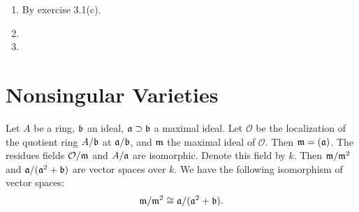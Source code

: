 \documentclass{note}
\begin{document}

\setcounter{exercise}{3}
\Ex
\begin{enumerate}
  \item By exercise 3.1(c).
  \item
  \item
\end{enumerate}

\section{Nonsingular Varieties}
\begin{proposition*}
  Let $A$ be a ring, $\mathfrak{b}$ an ideal, $\mathfrak{a} \supset \mathfrak{b}$ a
  maximal ideal. Let $\mathcal{O}$ be the localization of the quotient ring
  $A/\mathfrak{b}$ at $\mathfrak{a}/\mathfrak{b}$, and $\mathfrak{m}$ the maximal ideal of
  $\mathcal{O}$. Then $\mathfrak{m} = (\mathfrak{a})$. The residues fields
  $\mathcal{O}/\mathfrak{m}$ and $A/\mathfrak{a}$ are isomorphic. Denote this field by
  $k$. Then $\mathfrak{m}/\mathfrak{m}^2$ and $\mathfrak{a}/(\mathfrak{a}^2+\mathfrak{b})$ are
  vector spaces over $k$. We have the following isomorphism of vector spaces:
  \begin{equation*}
    \mathfrak{m}/\mathfrak{m}^2 \cong \mathfrak{a}/(\mathfrak{a}^2+\mathfrak{b}).
  \end{equation*}
\end{proposition*}
\end{document}

